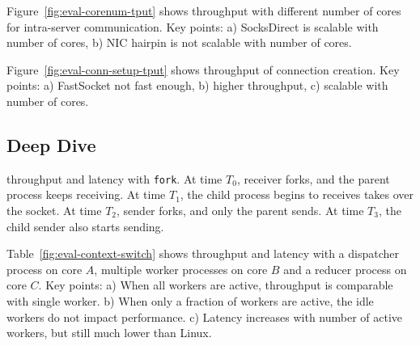 Figure~\ref{fig:eval-corenum-tput} shows throughput with different number of cores for intra-server communication. Key points: a) SocksDirect is scalable with number of cores, b) NIC hairpin is not scalable with number of cores.

Figure~\ref{fig:eval-conn-setup-tput} shows throughput of connection creation. Key points: a) FastSocket not fast enough, b) higher throughput, c) scalable with number of cores.

\subsection{Deep Dive}

throughput and latency with \texttt{fork}. At time $T_0$, receiver forks, and the parent process keeps receiving. At time $T_1$, the child process begins to receives takes over the socket. At time $T_2$, sender forks, and only the parent sends. At time $T_3$, the child sender also starts sending.


Table~\ref{fig:eval-context-switch} shows throughput and latency with a dispatcher process on core $A$, multiple worker processes on core $B$ and a reducer process on core $C$. Key points: a) When all workers are active, throughput is comparable with single worker. b) When only a fraction of workers are active, the idle workers do not impact performance. c) Latency increases with number of active workers, but still much lower than Linux.